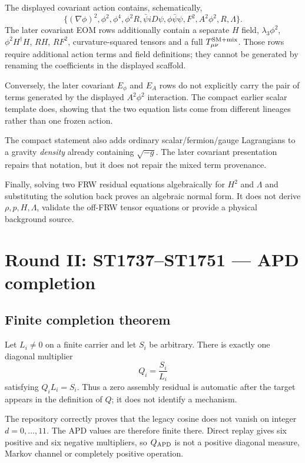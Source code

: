 \documentclass[11pt,a4paper]{article}
\begin{document}
The displayed covariant action contains, schematically,
\[
\{(\nabla\phi)^2,\phi^2,\phi^4,\phi^2R,
\bar\psi iD\psi,\phi\bar\psi\psi,F^2,A^2\phi^2,R,\Lambda\}.
\]
The later covariant EOM rows additionally contain a separate $H$ field,
$\lambda_3\phi^2$, $\phi^2H^\dagger H$, $RH$, $RF^2$, curvature-squared
tensors and a full $T_{\mu\nu}^{\rm SM+mix}$.  Those rows require additional
action terms and field definitions; they cannot be generated by renaming the
coefficients in the displayed scaffold.

Conversely, the later covariant $E_\phi$ and $E_A$ rows do not explicitly carry
the pair of terms generated by the displayed $A^2\phi^2$ interaction.  The
compact earlier scalar template does, showing that the two equation lists come
from different lineages rather than one frozen action.

The compact statement also adds ordinary scalar/fermion/gauge Lagrangians to a
gravity \emph{density} already containing $\sqrt{-g}$.  The later covariant
presentation repairs that notation, but it does not repair the mixed term
provenance.

Finally, solving two FRW residual equations algebraically for $H^2$ and
$\Lambda$ and substituting the solution back proves an algebraic normal form.
It does not derive $\rho,p,H,\Lambda$, validate the off-FRW tensor equations or
provide a physical background source.

\section{Round II: ST1737--ST1751 --- APD completion}

\subsection{Finite completion theorem}

Let $L_i\ne0$ on a finite carrier and let $S_i$ be arbitrary.  There is exactly
one diagonal multiplier
\[
Q_i=\frac{S_i}{L_i}
\]
satisfying $Q_iL_i=S_i$.  Thus a zero assembly residual is automatic after the
target appears in the definition of $Q$; it does not identify a mechanism.

The repository correctly proves that the legacy cosine does not vanish on
integer $d=0,\ldots,11$.  The APD values are therefore finite there.  Direct
replay gives six positive and six negative multipliers, so $Q_{\rm APD}$ is not
a positive diagonal measure, Markov channel or completely positive operation.
\end{document}
